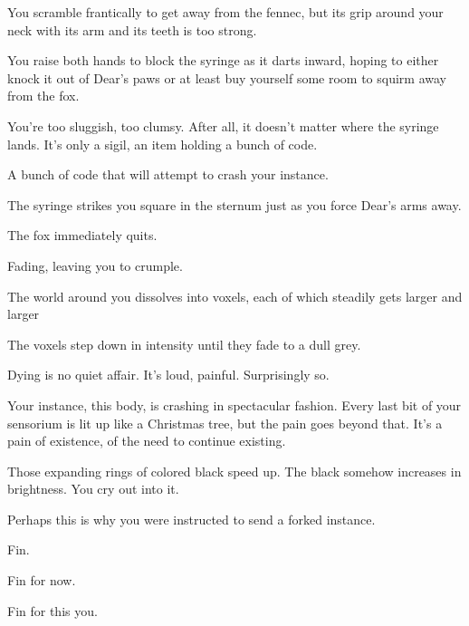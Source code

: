\null
\vfill

You scramble frantically to get away from the fennec, but its grip around your neck with its arm and its teeth is too strong.

You raise both hands to block the syringe as it darts inward, hoping to either knock it out of Dear's paws or at least buy yourself some room to squirm away from the fox.

You're too sluggish, too clumsy. After all, it doesn't matter where the syringe lands. It's only a sigil, an item holding a bunch of code.

A bunch of code that will attempt to crash your instance.

The syringe strikes you square in the sternum just as you force Dear's arms away.

The fox immediately quits.

Fading, leaving you to crumple.

The world around you dissolves into voxels, each of which steadily gets larger and larger

The voxels step down in intensity until they fade to a dull grey.

\vfill

\newpage

\null
\vfill

Dying is no quiet affair. It's loud, painful. Surprisingly so.

Your instance, this body, is crashing in spectacular fashion. Every last bit of your sensorium is lit up like a Christmas tree, but the pain goes beyond that. It's a pain of existence, of the need to continue existing.

Those expanding rings of colored black speed up. The black somehow increases in brightness. You cry out into it.

Perhaps this is why you were instructed to send a forked instance.

\vfill

\newpage

\null
\vfill

Fin.

\vfill

\newpage

\null
\vfill

Fin for now.

\vfill

\newpage

\null
\vfill

Fin for this you.

